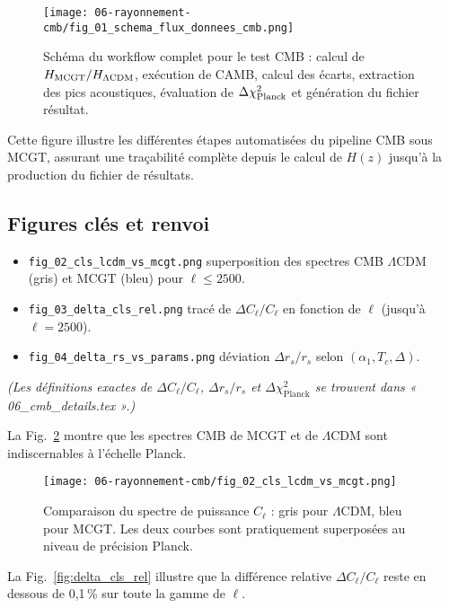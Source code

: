 \begin{figure}[htbp]
  \centering
  \texttt{[image: 06-rayonnement-cmb/fig\_01\_schema\_flux\_donnees\_cmb.png]}
  \caption{Schéma du workflow complet pour le test CMB : calcul de \(H_{\rm MCGT}/H_{\Lambda\rm CDM}\), exécution de CAMB, calcul des écarts, extraction des pics acoustiques, évaluation de \(\Delta\chi^2_{\rm Planck}\) et génération du fichier résultat.}
  \label{fig:flux_donnees_cmb}
\end{figure}

Cette figure illustre les différentes étapes automatisées du pipeline CMB sous MCGT, assurant une traçabilité complète depuis le calcul de \(H(z)\) jusqu’à la production du fichier de résultats.

\subsection{Figures clés et renvoi}

\begin{itemize}
  \item \texttt{fig\_02\_cls\_lcdm\_vs\_mcgt.png}
        superposition des spectres CMB \(\Lambda\)CDM (gris) et MCGT (bleu) pour \(\ell \le 2500\).
  \item \texttt{fig\_03\_delta\_cls\_rel.png}
        tracé de \(\Delta C_{\ell}/C_{\ell}\) en fonction de \(\ell\) (jusqu’à \(\ell=2500\)).
  \item \texttt{fig\_04\_delta\_rs\_vs\_params.png}
        déviation \(\Delta r_{s}/r_{s}\) selon \((\alpha_{1},T_{c},\Delta)\).
\end{itemize}

\noindent\emph{(Les définitions exactes de \(\Delta C_{\ell}/C_{\ell}\), \(\Delta r_{s}/r_{s}\) et \(\Delta\chi^{2}_{\mathrm{Planck}}\) se trouvent dans « 06\_cmb\_details.tex ».)}

\noindent La Fig.~\ref{fig:cls_lcdm_vs_mcgt} montre que les spectres CMB de MCGT et de \(\Lambda\)CDM sont indiscernables à l’échelle Planck.

\begin{figure}[htbp]
  \centering
  \texttt{[image: 06-rayonnement-cmb/fig\_02\_cls\_lcdm\_vs\_mcgt.png]}
  \caption{Comparaison du spectre de puissance \(C_\ell\) : gris pour \(\Lambda\)CDM, bleu pour MCGT. Les deux courbes sont pratiquement superposées au niveau de précision Planck.}
  \label{fig:cls_lcdm_vs_mcgt}
\end{figure}

\noindent La Fig.~\ref{fig:delta_cls_rel} illustre que la différence relative \(\Delta C_{\ell}/C_{\ell}\) reste en dessous de 0,1\,\% sur toute la gamme de \(\ell\).

